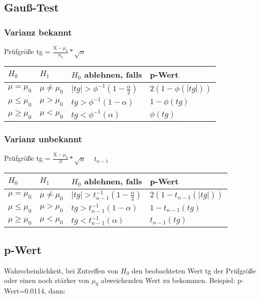 \documentclass[10pt,landscape,a4paper]{article}
\begin{document}
\begin{multicols}{3}
\subsection{Gauß-Test}
\subsubsection{Varianz bekannt}
Prüfgröße tg = $\frac{\text{\={X}} - \mu_0}{\sigma_0} * \sqrt{n}$

\begin{tabular}{ |p{1cm}|p{1cm}|p{2.8cm}|p{2.3cm}| }
	\hline
	$H_0$ & $H_1$ & $H_0$ ablehnen, falls & p-Wert\\
 	\hline
 	$\mu = \mu_0$ & $\mu \neq \mu_0$ & $|tg|>\phi^{-1}(1-\frac{\alpha}{2})$ & $2(1 - \phi(|tg|))$\\
 	\hline
 	$\mu \leq \mu_0$ & $\mu > \mu_0$ & $tg > \phi^{-1}(1 - \alpha)$ & $1 - \phi (tg)$\\
 	\hline
 	$\mu \geq \mu_0$ & $\mu < \mu_0$ & $tg < \phi^{-1}(\alpha)$ & $\phi (tg)$\\
 	\hline
\end{tabular}

\subsubsection{Varianz unbekannt}
Prüfgröße tg = $\frac{\text{\={X}} - \mu_0}{S} * \sqrt{n}$ ~ $t_{n-1}$

\begin{tabular}{ |p{1cm}|p{1cm}|p{2.8cm}|p{2.3cm}| }
	\hline
	$H_0$ & $H_1$ & $H_0$ ablehnen, falls & p-Wert\\
 	\hline
 	$\mu = \mu_0$ & $\mu \neq \mu_0$ & $|tg|>t^{-1}_{n-1}(1-\frac{\alpha}{2})$ & $2(1 - t_{n-1}(|tg|))$\\
 	\hline
 	$\mu \leq \mu_0$ & $\mu > \mu_0$ & $tg > t^{-1}_{n-1}(1 - \alpha)$ & $1 - t_{n-1} (tg)$\\
 	\hline
 	$\mu \geq \mu_0$ & $\mu < \mu_0$ & $tg < t^{-1}_{n-1}(\alpha)$ & $t_{n-1}(tg)$\\
 	\hline
\end{tabular}

\subsection{p-Wert}
Wahrscheinlichkeit, bei Zutreffen von $H_0$ den beobachteten Wert tg der Prüfgröße oder einen noch stärker von $\mu_0$ abweichenden Wert zu bekommen. 
Beispiel: p-Wert=0.0114, dann:


\end{multicols}
\end{document}
